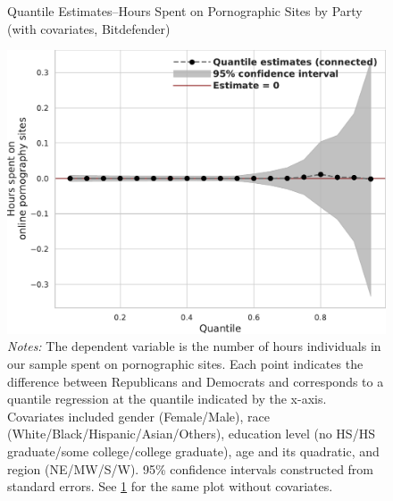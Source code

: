 \documentclass[12pt,twoside]{article}
\begin{document}
\begin{figure}[ht]
	\centering
	\caption{Quantile Estimates--Hours Spent on Pornographic Sites by Party (with covariates, Bitdefender)}
	\includegraphics[width=.55\linewidth]{figs/alphamountain_quantile_reg_covariates_duration_adult.pdf}
	\caption*{\footnotesize \emph{Notes:} 
		The dependent variable is the number of hours individuals in our sample spent on pornographic sites. Each point indicates the difference between Republicans and Democrats and corresponds to a quantile regression at the quantile indicated by the x-axis. Covariates included gender (Female/Male), race (White/Black/Hispanic/Asian/Others), education level (no HS/HS graduate/some college/college graduate), age and its quadratic, and region (NE/MW/S/W). 95\% confidence intervals constructed from standard errors. See \cref{fig:alphamountain_quantile_regression_duration_covariates} for the same plot without covariates.
	}
	\label{fig:alphamountain_quantile_regression_duration_covariates}
\end{figure}


\setcounter{table}{0}
\setcounter{figure}{0}
\setcounter{equation}{0}
\FloatBarrier
\renewcommand{\thetable}{F\arabic{table}}
\renewcommand{\thefigure}{F\arabic{figure}}
\renewcommand{\theequation}{F\arabic{equation}}
\end{document}
